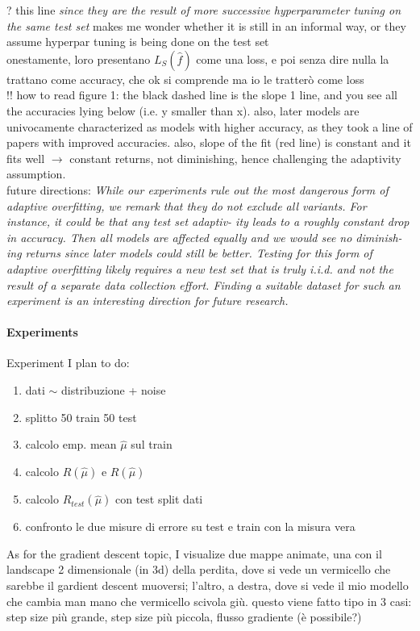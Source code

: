 {\color{benred}?} this line {\it since they are the result of more successive hyperparameter tuning on the same test set\/} makes me wonder whether it is still in an informal way, or they assume hyperpar tuning is being done on the test set 
\\

{\color{benred} onestamente, loro presentano $L_S(\hat f)$ come una loss, e poi senza dire nulla la trattano come accuracy, che ok si comprende ma io le tratterò come loss} 
\\

{\color{benred}!! how to read figure 1:} the black dashed line is the slope 1 line, and you see all the accuracies lying below (i.e. y smaller than x). also, later models are univocamente characterized as models with higher accuracy, as they took a line of papers with improved accuracies. also, slope of the fit (red line) is constant and it fits well $\rightarrow$ constant returns, not diminishing, hence challenging the adaptivity assumption. 
\\

{\color{benred} future directions:} {\it While our experiments rule out the most dangerous form of
adaptive overfitting, we remark that they do not exclude all
variants. For instance, it could be that any test set adaptiv-
ity leads to a roughly constant drop in accuracy. Then all
models are affected equally and we would see no diminish-
ing returns since later models could still be better. Testing
for this form of adaptive overfitting likely requires a new
test set that is truly i.i.d. and not the result of a separate
data collection effort. Finding a suitable dataset for such an
experiment is an interesting direction for future research.}


\newpage
\paragraph{Experiments}
Experiment I plan to do:
\begin{enumerate}
    \item dati $\sim$ distribuzione + noise
    \item splitto 50 train 50 test
    \item calcolo emp. mean $\hat\mu$ sul train
    \item calcolo $\hat R(\hat\mu)$ e $R(\hat\mu)$ 
    \item calcolo $\hat R_{test}(\hat\mu)$ con test split dati 
    \item confronto le due misure di errore su test e train con la misura vera
\end{enumerate}

As for the gradient descent topic, I visualize due mappe animate, una con il landscape 2 dimensionale (in 3d) della perdita, dove si vede un vermicello che sarebbe il gardient descent muoversi; l'altro, a destra, dove si vede il mio modello che cambia man mano che vermicello scivola giù. questo viene fatto tipo in 3 casi: step size più grande, step size più piccola, flusso gradiente (è possibile?) 